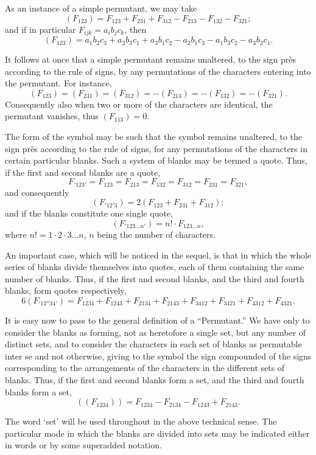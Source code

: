 \documentclass[11pt,a4paper]{article}
\theoremstyle{plain}
\begin{document}
As an instance of a simple permutant, we may take
\[(F_{123}) = F_{123} + F_{231} + F_{312} - F_{213} - F_{132} - F_{321};\]
and if in particular $F_{ijk} = a_i b_j c_k$, then
\[(F_{123}) = a_1 b_2 c_3 + a_2 b_3 c_1 + a_3 b_1 c_2 - a_2 b_1 c_3 - a_1 b_3 c_2 - a_3 b_2 c_1.\]

It follows at once that a simple permutant remains unaltered, to the sign pr\`{e}s according to the rule of signs, by any permutations of the characters entering into the permutant. For instance,
\[(F_{123}) = (F_{231}) = (F_{312}) = -(F_{213}) = -(F_{132}) = -(F_{321}).\]
Consequently also when two or more of the characters are identical, the permutant vanishes, thus $(F_{113}) = 0$.

The form of the symbol may be such that the symbol remains unaltered, to the sign pr\`{e}s according to the rule of signs, for any permutations of the characters in certain particular blanks. Such a system of blanks may be termed a quote. Thus, if the first and second blanks are a quote,
\[F_{'123'} = F_{123} = F_{213} = F_{132} = F_{312} = F_{231} = F_{321},\]
and consequently
\[(F_{'12'3}) = 2(F_{123} + F_{231} + F_{312});\]
and if the blanks constitute one single quote,
\[(F_{'123\ldots n'}) = n! \cdot F_{123\ldots n},\]
where $n! = 1 \cdot 2 \cdot 3 \ldots n$, $n$ being the number of characters.

An important case, which will be noticed in the sequel, is that in which the whole series of blanks divide themselves into quotes, each of them containing the same number of blanks. Thus, if the first and second blanks, and the third and fourth blanks, form quotes respectively,
\[6(F_{'12''34'}) = F_{1234} + F_{1243} + F_{2134} + F_{2143} + F_{3412} + F_{3421} + F_{4312} + F_{4321}.\]

It is easy now to pass to the general definition of a ``Permutant.'' We have only to consider the blanks as forming, not as heretofore a single set, but any number of distinct sets, and to consider the characters in each set of blanks as permutable inter se and not otherwise, giving to the symbol the sign compounded of the signs corresponding to the arrangements of the characters in the different sets of blanks. Thus, if the first and second blanks form a set, and the third and fourth blanks form a set,
\[((F_{1234})) = F_{1234} - F_{2134} - F_{1243} + F_{2143}.\]

The word `set' will be used throughout in the above technical sense. The particular mode in which the blanks are divided into sets may be indicated either in words or by some superadded notation.
\end{document}
